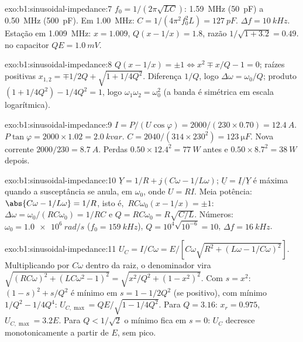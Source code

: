 \begin{solution}{exo:b1:sinusoidal-impedance:7}
$f_0 = 1/(2\pi\sqrt{LC})$: \qty{1.59}{MHz} (\qty{50}{pF}) a \qty{0.50}{MHz}
(\qty{500}{pF}). Em \qty{1.00}{MHz}: $C = 1/(4\pi^2f_0^2L) = \qty{127}{pF}$.
$\Delta f = \qty{10}{kHz}$. Estação em \qty{1.009}{MHz}: $x = 1.009$,
$Q(x - 1/x) = 1.8$, razão $1/\sqrt{1 + 3.2} = 0.49$.  no capacitor
$QE = \qty{1.0}{mV}$.
\end{solution}

\begin{solution}{exo:b1:sinusoidal-impedance:8}
$Q(x - 1/x) = \pm1 \Leftrightarrow x^2 \mp x/Q - 1 = 0$; raízes positivas
$x_{1,2} = \mp 1/2Q + \sqrt{1 + 1/4Q^2}$. Diferença $1/Q$, logo
$\Delta\omega = \omega_0/Q$; produto $(1 + 1/4Q^2) - 1/4Q^2 = 1$, logo
$\omega_1\omega_2 = \omega_0^2$ (a banda é simétrica em escala logarítmica).
\end{solution}

\begin{solution}{exo:b1:sinusoidal-impedance:9}
$I = P/(U\cos\varphi) = 2000/(230 \times 0.70) = \qty{12.4}{A}$.  $P\tan\varphi = 2000 \times 1.02 = \qty{2.0}{kvar}$. $C = 2040/(314
\times 230^2) = \qty{123}{\micro F}$. Nova corrente $2000/230 = \qty{8.7}{A}$.
Perdas $0.50 \times 12.4^2 = \qty{77}{W}$ antes e $0.50 \times 8.7^2 =
\qty{38}{W}$ depois.
\end{solution}

\begin{solution}{exo:b1:sinusoidal-impedance:10}
$\underline Y = 1/R + j(C\omega - 1/L\omega)$; $\underline U = \underline I/
\underline Y$ é máxima quando a susceptância se anula, em $\omega_0$,
onde $U = RI$. Meia potência: $\abs{C\omega - 1/L\omega} = 1/R$, isto é,\
$RC\omega_0(x - 1/x) = \pm1$: $\Delta\omega = \omega_0/(RC\omega_0) = 1/RC$
e $Q = RC\omega_0 = R\sqrt{C/L}$. Números: $\omega_0 = \qty{1.0e6}{rad/s}$
($f_0 = \qty{159}{kHz}$), $Q = 10^4\sqrt{10^{-6}} = 10$, $\Delta f =
\qty{16}{kHz}$.
\end{solution}

\begin{solution}{exo:b1:sinusoidal-impedance:11}
$U_C = I/C\omega = E/[C\omega\sqrt{R^2 + (L\omega - 1/C\omega)^2}]$.
Multiplicando por $C\omega$ dentro da raiz, o denominador vira
$\sqrt{(RC\omega)^2 + (LC\omega^2 - 1)^2} =
\sqrt{x^2/Q^2 + (1 - x^2)^2}$. Com $s = x^2$: $(1 - s)^2 + s/Q^2$ é
mínimo em $s = 1 - 1/2Q^2$ (se positivo), com mínimo $1/Q^2 - 1/4Q^4$:
$U_{C,\max} = QE/\sqrt{1 - 1/4Q^2}$. Para $Q = 3.16$: $x_r = 0.975$,
$U_{C,\max} = 3.2E$. Para $Q < 1/\sqrt2$ o mínimo fica em $s = 0$: $U_C$
decresce monotonicamente a partir de $E$, sem pico.
\end{solution}

